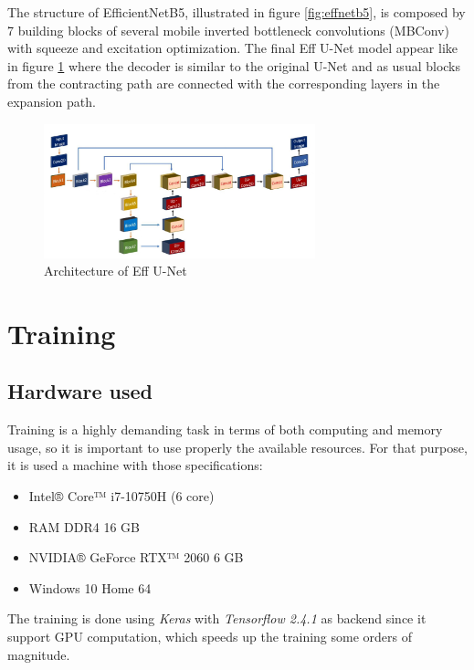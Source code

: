 \documentclass[a4paper,10pt]{report}
\begin{document}
The structure of EfficientNetB5, illustrated in figure \ref{fig:effnetb5}, is composed by 7 building blocks of several mobile inverted bottleneck convolutions (MBConv) with squeeze and excitation optimization. 
The final Eff U-Net model appear like in figure \ref{fig:effunet} where the decoder is similar to the original U-Net and as usual blocks from the contracting path are connected with the corresponding layers in the expansion path.

\begin{figure}[h]
    \centering
    \includegraphics[width=0.70\textwidth]{assets/img/effunet.png}
    \caption{Architecture of Eff U-Net}
    \label{fig:effunet}
\end{figure}


\section{Training}\label{sec:section-42}
\subsection{Hardware used}\label{subsec:subsection-421}
Training is a highly demanding task in terms of both computing and memory usage, so it is important to use properly the available resources. 
For that purpose, it is used a machine with those specifications:
\begin{itemize}
    \item Intel® Core™ i7-10750H (6 core)
    \item RAM DDR4 16 GB
    \item NVIDIA® GeForce RTX™ 2060 6 GB
    \item Windows 10 Home 64
\end{itemize}

The training is done using \textit{Keras} with \textit{Tensorflow 2.4.1} as backend since it support GPU computation, which speeds up the training some orders of magnitude.
\end{document}
